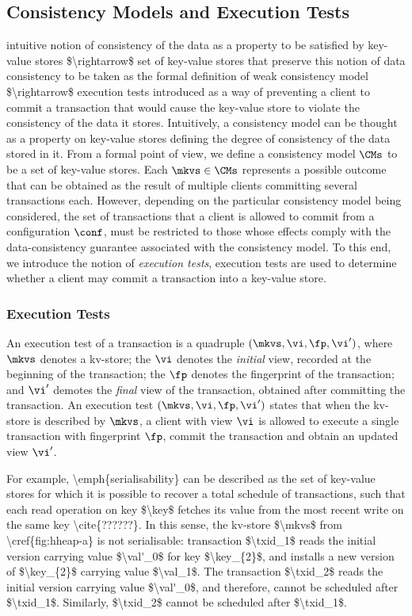 \subsection{Consistency Models and Execution Tests}
\ac{intuitive notion of consistency of the data as a 
property to be satisfied by key-value stores $\rightarrow$
set of key-value stores that preserve this notion of data consistency to be taken as the formal definition 
of weak consistency model $\rightarrow$ execution tests introduced as a way of preventing a client to commit 
a transaction that would cause the key-value store to violate the consistency of the data it stores.}
Intuitively, a consistency model can be thought as a property on key-value stores 
defining the degree of consistency of the data stored in it.
From a formal point of view, we define a consistency model 
$\CMs$ to be a set of key-value stores.  
Each $\mkvs \in \CMs$ represents a possible outcome that 
can be obtained as the result of multiple clients committing several transactions each. 
However, depending on the particular consistency model being considered, the set of transactions that a client is allowed to commit  
from a configuration $\conf$, must be restricted to those whose effects comply with the data-consistency guarantee associated with 
the consistency model. 
To this end, we introduce the notion of \emph{execution tests}, 
execution tests are used to determine whether a client may commit a transaction into a key-value store.

\subsubsection{Execution Tests}
An execution test of a transaction is a quadruple $(\mkvs, \vi, \fp, \vi')$, where $\mkvs$ denotes a kv-store;
the $\vi$ denotes the \emph{initial} view, recorded at the beginning of the transaction; 
the $\fp$ denotes the fingerprint of the transaction; and 
$\vi'$ demotes the \emph{final} view of the transaction, obtained after committing the transaction. 
An execution test $(\mkvs, \vi, \fp, \vi')$ states that when the kv-store is described by $\mkvs$, a client with view $\vi$ is allowed to execute a single transaction with fingerprint $\fp$, commit the transaction and obtain an updated view $\vi'$. 

\ac{
For example, \emph{serialisability} can be described as the set 
of key-value stores for which it is possible to recover a total schedule of transactions, 
such that each read operation on key $\key$ fetches its value from the 
most recent write on the same key \cite{??????}.
In this sense, the kv-store $\mkvs$ from \cref{fig:hheap-a} is not serialisable: 
transaction $\txid_1$ reads the initial version carrying value $\val'_0$ for key $\key_{2}$, 
and installs a new version of $\key_{2}$ carrying value $\val_1$. The transaction $\txid_2$ 
reads the initial version carrying value $\val'_0$, and therefore, 
cannot be scheduled after $\txid_1$. Similarly, $\txid_2$ cannot be scheduled after $\txid_1$.
}

